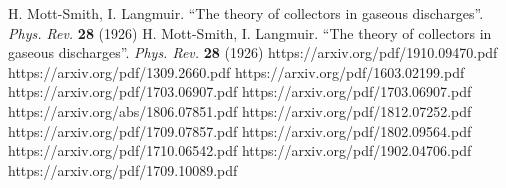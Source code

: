 \documentclass{mipt-thesis-bs}
\begin{document}
\begin{thebibliography}{99}
        H. Mott-Smith, I. Langmuir. ``The theory of collectors in gaseous discharges''. \emph{Phys. Rev.} \textbf{28} (1926)
        H. Mott-Smith, I. Langmuir. ``The theory of collectors in gaseous discharges''. \emph{Phys. Rev.} \textbf{28} (1926)
     https://arxiv.org/pdf/1910.09470.pdf
     https://arxiv.org/pdf/1309.2660.pdf
     https://arxiv.org/pdf/1603.02199.pdf
     https://arxiv.org/pdf/1703.06907.pdf
    https://arxiv.org/pdf/1703.06907.pdf
    https://arxiv.org/abs/1806.07851.pdf
    https://arxiv.org/pdf/1812.07252.pdf
    https://arxiv.org/pdf/1709.07857.pdf
    https://arxiv.org/pdf/1802.09564.pdf
    https://arxiv.org/pdf/1710.06542.pdf
     https://arxiv.org/pdf/1902.04706.pdf
    https://arxiv.org/pdf/1709.10089.pdf
    
\end{thebibliography}
\end{document}
